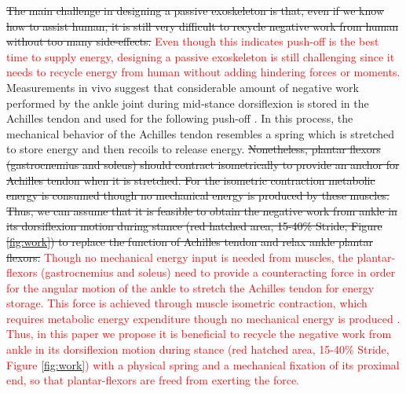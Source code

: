 \documentclass[twocolumn,cleanfoot,10pt]{asme2ej}
\begin{document}
\sout{The main challenge in designing a passive exoskeleton is that, even if we know how to assist human, it is still very difficult to recycle negative work from human without too many side-effects.}
\textcolor{red}{Even though this indicates push-off is the best time to supply energy, designing a passive exoskeleton is still challenging since it needs to recycle energy from human without adding hindering forces or moments.}
Measurements in vivo suggest that considerable amount of negative work performed by the ankle joint during mid-stance dorsiflexion is stored in the Achilles tendon and used for the following push-off \cite{RN16}.
In this process, the mechanical behavior of the Achilles tendon resembles a spring which is stretched to store energy and then recoils to release energy.
\sout{Nonetheless, plantar flexors (gastrocnemius and soleus) should contract isometrically to provide an anchor for Achilles tendon when it is stretched. For the isometric contraction metabolic energy is consumed though no mechanical energy is produced by these muscles\cite{RN17}. Thus, we can assume that it is feasible to obtain the negative work from ankle in its dorsiflexion motion during stance (red hatched area, 15-40\% Stride, Figure \ref{fig:work}) to replace the function of Achilles tendon and relax ankle plantar flexors.}
\textcolor{red}{Though no mechanical energy input is needed from muscles, the plantar-flexors (gastrocnemius and soleus) need to provide a counteracting force in order for the angular motion of the ankle to stretch the Achilles tendon for energy storage.
This force is achieved through muscle isometric contraction, which requires metabolic energy expenditure though no mechanical energy is produced \cite{RN17}.
Thus, in this paper we propose it is beneficial to recycle the negative work from ankle in its dorsiflexion motion during stance (red hatched area, 15-40\% Stride, Figure \ref{fig:work}) with a physical spring and a mechanical fixation of its proximal end, so that plantar-flexors are freed from exerting the force.}
\end{document}
